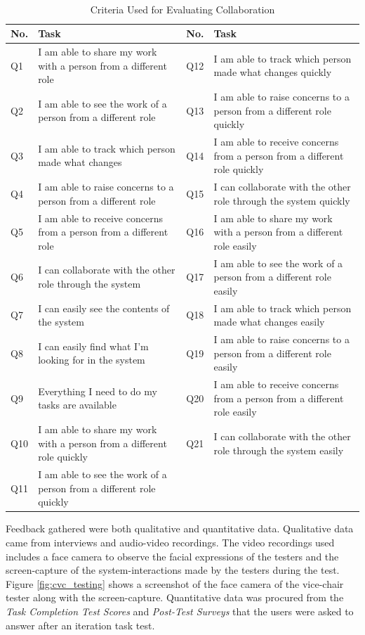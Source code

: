 \begin{table}
  \centering
  \caption{Criteria Used for Evaluating Collaboration}~\label{tab:itr2_questions}
  \addtolength{\tabcolsep}{2pt} 
  \begin{tabular}{p{.5cm}|p{2.75cm}|p{.5cm}|p{2.70cm}}
  	\toprule
    \rule{0pt}{8pt}No. & Task & No. & Task\\[2pt]
    \toprule
    Q1 & I am able to share my work with a person from a different role &  Q12 & I am able to track which person made what changes quickly\\
    Q2 &  I am able to see the work of a person from a different role  & Q13 & I am able to raise concerns to a person from a different role quickly\\
    Q3 & I am able to track which person made what changes & Q14 & I am able to receive concerns from a person from a different role quickly\\
    Q4 & I am able to raise concerns to a person from a different role & Q15 & I can collaborate with the other role through the system quickly\\
    Q5 & I am able to receive concerns from a person from a different role & Q16 & I am able to share my work with a person from a different role easily\\
    Q6 & I can collaborate with the other role through the system & Q17 & I am able to see the work of a person from a different role easily\\
    Q7 & I can easily see the contents of the system & Q18 & I am able to track which person made what changes easily\\
    Q8 & I can easily find what I'm looking for in the system & Q19 & I am able to raise concerns to a person from a different role easily\\
    Q9 & Everything I need to do my tasks are available  & Q20 & I am able to receive concerns from a person from a different role easily\\
    Q10 & I am able to share my work with a person from a different role quickly & Q21 & I can collaborate with the other role through the system easily\\
    Q11 & I am able to see the work of a person from a different role quickly & & \\
    \bottomrule
  \end{tabular}
  \addtolength{\tabcolsep}{-2pt} 
\end{table}

Feedback gathered were both qualitative and quantitative data. Qualitative data came from interviews and audio-video recordings. The video recordings used includes a face camera to observe the facial expressions of the testers and the screen-capture of the system-interactions made by the testers during the test. Figure \ref{fig:cvc_testing} shows a screenshot of the face camera of the vice-chair tester along with the screen-capture. Quantitative data was procured from the \textit{Task Completion Test Scores} and \textit{Post-Test Surveys} that the users were asked to answer after an iteration task test. 


